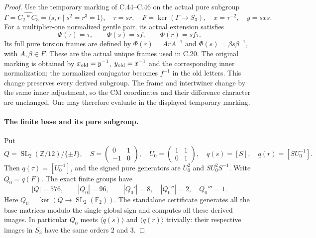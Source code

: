 \begin{proof}
Use the temporary marking of C.44--C.46 on the actual pure subgroup
\[
 \Gamma=\widehat{C_2*C_3}=\langle s,r\mid s^2=r^3=1\rangle,
 \quad \tau=sr,\quad F=\ker(\Gamma\to S_3),\quad
 x=\tau^{-2},\quad y=sxs.
\]
For a multiplier-one normalized gentle pair, its actual extension
satisfies
\[
          \Phi(\tau)=\tau,\qquad \Phi(s)=sf,
          \qquad \Phi(r)=sf\tau.                     \tag{C.47.2}
\]
Its full pure torsion frames are defined by
$\Phi(r)=ArA^{-1}$ and $\Phi(s)=\beta s\beta^{-1}$,
with $A,\beta\in F$. These are the actual unique frames used in
C.20. The original marking is obtained by
$x_{\rm old}=y^{-1}$, $y_{\rm old}=x^{-1}$ and the corresponding
inner normalization; the normalized conjugator becomes $f^{-1}$
in the old letters. This change preserves every derived subgroup.
The frame and intertwiner change by the same inner adjustment,
so the CM coordinates and their difference character are unchanged.
One may therefore evaluate in the displayed temporary marking.

\paragraph{The finite base and its pure subgroup.}
Put
\[
 Q=\operatorname{SL}_2(\mathbb Z/12)/\{\pm I\},\quad
 S=\begin{pmatrix}0&1\\-1&0\end{pmatrix},\quad
 U_0=\begin{pmatrix}1&1\\0&1\end{pmatrix},\quad
 q(s)=[S],\quad q(r)=[SU_0^{-1}].                    \tag{C.47.3}
\]
Then $q(\tau)=[U_0^{-1}]$, and the signed pure generators are
$U_0^2$ and $SU_0^2S^{-1}$. Write $Q_0=q(F)$.
The exact finite groups have
\[
 |Q|=576,\qquad |Q_0|=96,\qquad
 |Q_0'|=8,\quad |Q_0''|=2,\quad Q_0'''=1.            \tag{C.47.4}
\]
Here $Q_0=\ker(Q\to\operatorname{SL}_2(\mathbb F_2))$.
The standalone certificate generates all the base matrices modulo
the single global sign and computes all these derived images.
In particular $Q_0$ meets $\langle q(s)\rangle$ and
$\langle q(r)\rangle$ trivially: their respective images in
$S_3$ have the same orders $2$ and $3$.


\end{proof}
